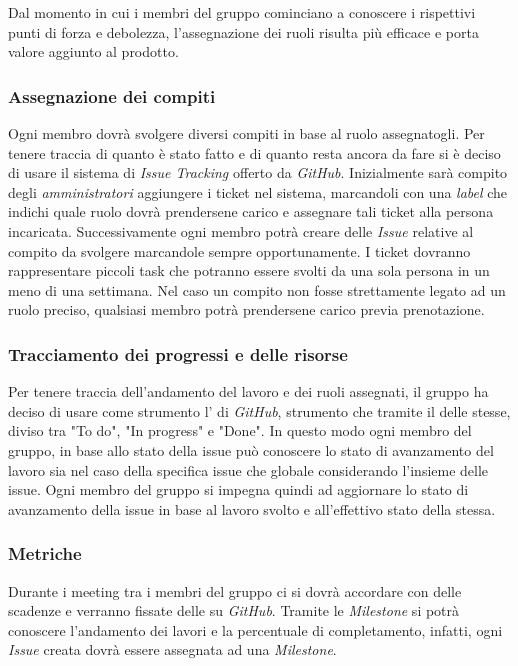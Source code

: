Dal momento in cui i membri del gruppo cominciano a conoscere i rispettivi punti di forza e debolezza, l'assegnazione dei ruoli risulta 
più efficace e porta valore aggiunto al prodotto.

\subsubsection{Assegnazione dei compiti}

Ogni membro dovrà svolgere diversi compiti in base al ruolo assegnatogli. Per tenere traccia di quanto è stato fatto e 
di quanto resta ancora da fare si è deciso di usare il sistema di \emph{Issue Tracking} offerto da \emph{GitHub}. Inizialmente sarà compito 
degli \emph{amministratori} aggiungere i ticket nel sistema, marcandoli con una \emph{label} che indichi quale ruolo 
dovrà prendersene carico e assegnare tali ticket alla persona incaricata. Successivamente ogni membro potrà creare delle \emph{Issue} 
relative al compito da svolgere marcandole sempre opportunamente. I ticket dovranno rappresentare piccoli task che potranno essere svolti 
da una sola persona in un meno di una settimana. Nel caso un compito non fosse strettamente legato ad un ruolo preciso, qualsiasi membro 
potrà prendersene carico previa prenotazione.

\subsubsection{Tracciamento dei progressi e delle risorse}
Per tenere traccia dell'andamento del lavoro e dei ruoli assegnati, il gruppo ha deciso di usare come strumento 
l' di \emph{GitHub}, strumento che tramite il  delle 
 stesse, diviso tra "To do", "In progress" e "Done". In questo modo ogni membro del gruppo, in 
base allo stato della issue può conoscere lo stato di avanzamento del lavoro sia nel caso della specifica issue
che globale considerando l'insieme delle issue. Ogni membro del gruppo si impegna quindi ad aggiornare lo stato
di avanzamento della issue in base al lavoro svolto e all'effettivo stato della stessa.

\subsubsection{Metriche}

Durante i meeting tra i membri del gruppo ci si dovrà accordare con delle scadenze e verranno fissate delle 
 su \emph{GitHub}. Tramite le \emph{Milestone} si potrà conoscere l'andamento dei lavori e la 
percentuale di completamento, infatti, ogni \emph{Issue} creata dovrà essere assegnata ad una \emph{Milestone}.


